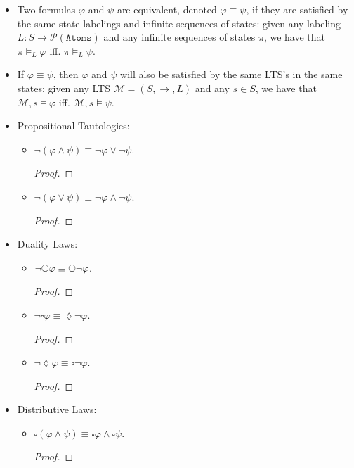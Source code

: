 \documentclass[12pt]{article}
\newcommand{\iscircle}{\mathord{\scalerel*{\bigcirc}{\square}}}
\begin{document}
    \begin{itemize}
        \item Two formulas $\varphi$ and $\psi$ are equivalent, denoted $\varphi \equiv \psi$, if they are satisfied by the same state labelings and infinite sequences of states: 
        given any labeling $L: S \rightarrow \mathcal{P}(\texttt{Atoms})$ and any infinite sequences of states $\pi$, we have that $\pi \models_L \varphi$ iff. $\pi \models_L \psi$.
        \item If $\varphi \equiv \psi$, then $\varphi$ and $\psi$ will also be satisfied by the same LTS's in the same states:
        given any LTS $\mathcal{M} = (S, \rightarrow, L)$ and any $s \in S$, we have that $\mathcal{M}, s \models \varphi$ iff. $\mathcal{M}, s \models \psi$.
        \item Propositional Tautologies:
        \begin{itemize}
            \item $\neg(\varphi \land \psi) \equiv \neg\varphi \lor \neg\psi$.
            \begin{proof}
                
            \end{proof}
            \item $\neg(\varphi \lor \psi) \equiv \neg\varphi \land \neg\psi$.
            \begin{proof}
                
            \end{proof}
        \end{itemize}
        \item Duality Laws:
        \begin{itemize}
            \item $\neg\iscircle\varphi \equiv \iscircle\neg\varphi$.
            \begin{proof}
                
            \end{proof}
            \item $\neg\square\varphi \equiv \lozenge\neg\varphi$.
            \begin{proof}
                
            \end{proof}
            \item $\neg\lozenge\varphi \equiv \square\neg\varphi$.
            \begin{proof}
                
            \end{proof}
        \end{itemize}
        \item Distributive Laws:
        \begin{itemize}
            \item $\square(\varphi \land \psi) \equiv \square\varphi \land \square\psi$.
            \begin{proof}
                

\end{proof}
\end{itemize}
\end{itemize}
\end{document}
